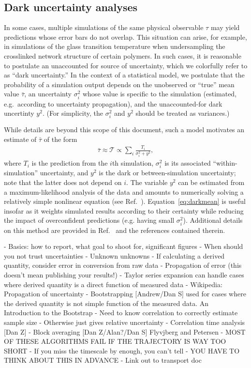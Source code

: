 \subsection{Dark uncertainty analyses}

In some cases, multiple simulations of the same physical observable $\tau$ may yield predictions whose error bars do not overlap.  This situation can arise, for example, in simulations of the glass transition temperature when undersampling the crosslinked network structure of certain polymers.  In such cases, it is reasonable to postulate an unaccounted for source of uncertainty, which we colorfully refer to as ``dark uncertainty.''  In the context of a statistical model, we postulate that the probability of a simulation output depends on the unobserved or ``true'' mean value $\bar \tau$, an uncertainty $\sigma_i^2$ whose value is specific to the simulation (estimated, e.g.\ according to uncertainty propagation), and the unaccounted-for dark uncertinty $y^2$.  (For simplicity, the $\sigma_i^2$ and $y^2$ should be treated as variances.)  

While details are beyond this scope of this document, such a model motivates an estimate of $\bar \tau$ of the form 
\begin{align}
\bar \tau \approx \mathcal T \propto \sum_i \frac{T_i}{\sigma_i^2 + y^2}, \label{eq:darkmean}
\end{align}
where $T_i$ is the prediction from the $i$th simulation, $\sigma_i^2$ is its associated ``within-simulation'' uncertainty, and $y^2$ is the dark or between-simulation uncertainty; note that the latter does not depend on $i$.  The variable $y^2$ can be estimated from a maximum-likelihood analysis of the data and amounts to numerically solving a relatively simple nonlinear equation (see Ref.~\cite{patrone1}).  Equation~\eqref{eq:darkmean} is useful insofar as it weights simulated results according to their certainty while reducing the impact of overconfident predictions (e.g. having small $\sigma_i^2$).  Additional details on this method are provided in Ref.~\cite{patrone1} and the references contained therein.



- Basics: how to report, what goal to shoot for, significant figures
- When should you not trust uncertainties
    - Unknown unknowns
- If calculating a derived quantity, consider error in conversion from raw data 
    - Propagation of error (this doesn’t mean publishing your results!)
    - Taylor series expansion can handle cases where derived quantity is a direct function of measured data
    - Wikipedia: Propagation of uncertainty
    - Bootstrapping [Andrew/Dan S]
used for cases where the derived quantity is not simple function of the measured data.
An Introduction to the Bootstrap
    - Need to know correlation to correctly estimate sample size
    - Otherwise just gives relative uncertainty
- Correlation time analysis [Dan Z]
- Block averaging [Dan Z/Alan?/Dan S] Flyvjberg and Petersen 
- MOST OF THESE ALGORITHMS FAIL IF THE TRAJECTORY IS WAY TOO SHORT
    - If you miss the timescale by enough, you can’t tell
    - YOU HAVE TO THINK ABOUT THIS IN ADVANCE
- Link out to transport doc
